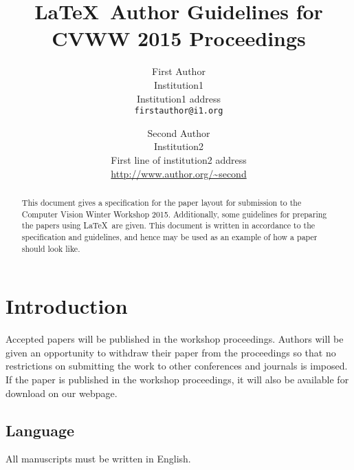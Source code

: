 \documentclass[11pt,twoside,twocolumn,a4paper]{article}
\begin{document}
\title{\LaTeX\ Author Guidelines for CVWW 2015 Proceedings}

\author{First Author\\
Institution1\\
Institution1 address\\
{\tt\small firstauthor@i1.org}
\and
Second Author\\
Institution2\\
First line of institution2 address\\
{\small\url{http://www.author.org/~second}}
}

\maketitle
\ifcvwwfinal\thispagestyle{fancy}\fi


\begin{abstract}
   This document gives a specification for the paper layout for submission to the Computer Vision Winter Workshop 2015. Additionally, 
some guidelines for preparing the papers using \LaTeX\ are given. This document is written in accordance to the specification and guidelines, 
and hence may be used as an example of how a paper should look like. 
\end{abstract}


\section{Introduction}

Accepted papers will be published in the workshop proceedings.
Authors will be given an opportunity to withdraw
their paper from the proceedings so that no
restrictions on submitting the work to other conferences
and journals is imposed. If the paper is published
in the workshop proceedings, it will also be
available for download on our webpage.


\subsection{Language}
All manuscripts must be written in English. 
\end{document}
